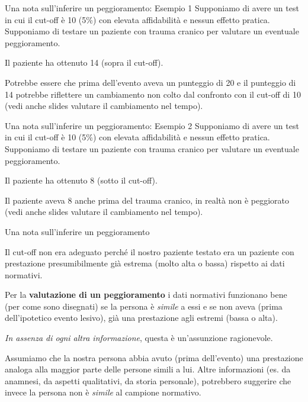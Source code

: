 \documentclass[
  ignorenonframetext,
  aspectratio=169,
]{beamer}
\begin{document}
\begin{frame}{Una nota sull'inferire un peggioramento: Esempio 1}
\label{una-nota-sullinferire-un-peggioramento-esempio-1}
Supponiamo di avere un test in cui il cut-off è 10 (5\%) con elevata
affidabilità e nessun effetto pratica. Supponiamo di testare un paziente
con trauma cranico per valutare un eventuale peggioramento.

Il paziente ha ottenuto 14 (sopra il cut-off).

Potrebbe essere che prima dell'evento aveva un punteggio di 20 e il
punteggio di 14 potrebbe riflettere un cambiamento non colto dal
confronto con il cut-off di 10 (vedi anche slides valutare il
cambiamento nel tempo).
\end{frame}

\begin{frame}{Una nota sull'inferire un peggioramento: Esempio 2}
\label{una-nota-sullinferire-un-peggioramento-esempio-2}
Supponiamo di avere un test in cui il cut-off è 10 (5\%) con elevata
affidabilità e nessun effetto pratica. Supponiamo di testare un paziente
con trauma cranico per valutare un eventuale peggioramento.

Il paziente ha ottenuto 8 (sotto il cut-off).

Il paziente aveva 8 anche prima del trauma cranico, in realtà non è
peggiorato (vedi anche slides valutare il cambiamento nel tempo).
\end{frame}

\begin{frame}{Una nota sull'inferire un peggioramento}
\label{una-nota-sullinferire-un-peggioramento}
\small

Il cut-off non era adeguato perché il nostro paziente testato era un
paziente con prestazione presumibilmente già estrema (molto alta o
bassa) rispetto ai dati normativi.

Per la \textbf{valutazione di un peggioramento} i dati normativi
funzionano bene (per come sono disegnati) se la persona è \emph{simile}
a essi e se non aveva (prima dell'ipotetico evento lesivo), già una
prestazione agli estremi (bassa o alta).

\emph{In assenza di ogni altra informazione}, questa è un'assunzione
ragionevole.

Assumiamo che la nostra persona abbia avuto (prima dell'evento) una
prestazione analoga alla maggior parte delle persone simili a lui. Altre
informazioni (es. da anamnesi, da aspetti qualitativi, da storia
personale), potrebbero suggerire che invece la persona non è
\emph{simile} al campione normativo.
\end{frame}
\end{document}
